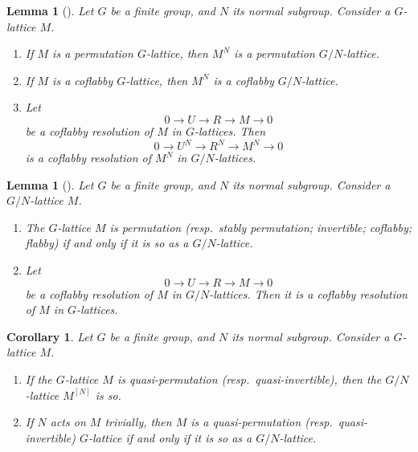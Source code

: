 \documentclass[12pt]{amsart}
\theoremstyle{plain}
\newtheorem{cor}[thm]{Corollary}
\newtheorem{lem}[thm]{Lemma}
\theoremstyle{definition}
\numberwithin{thm}{section}
\numberwithin{equation}{section}
\begin{document}
\begin{lem}[{\cite[p.~179, Lemme 2 (i), (ii), (iii)]{ColliotThelene1977}}]\label{lem:qtfx}
Let $G$ be a finite group, and $N$ its normal subgroup. Consider a $G$-lattice $M$. 
\begin{enumerate}
\item If $M$ is a permutation $G$-lattice, then $M^{N}$ is a permutation $G/N$-lattice. 
\item If $M$ is a coflabby $G$-lattice, then $M^{N}$ is a coflabby $G/N$-lattice. 
\item Let
\begin{equation*}
0\rightarrow U \rightarrow R \rightarrow M \rightarrow 0
\end{equation*}
be a coflabby resolution of $M$ in $G$-lattices. Then
\begin{equation*}
0\rightarrow U^{N} \rightarrow R^{N} \rightarrow M^{N} \rightarrow 0
\end{equation*}
is a coflabby resolution of $M^{N}$ in $G/N$-lattices. 
\end{enumerate}
\end{lem}

\begin{lem}[{\cite[p.~179, Lemme 2]{ColliotThelene1977}}]\label{lem:qtac}
Let $G$ be a finite group, and $N$ its normal subgroup. Consider a $G/N$-lattice $M$. 
\begin{enumerate}
\item The $G$-lattice $M$ is permutation (resp.~stably permutation; invertible; coflabby; flabby) if and only if it is so as a $G/N$-lattice. 
\item Let
\begin{equation*}
0\rightarrow U \rightarrow R \rightarrow M \rightarrow 0
\end{equation*}
be a coflabby resolution of $M$ in $G/N$-lattices. Then it is a coflabby resolution of $M$ in $G$-lattices. 
\end{enumerate}
\end{lem}

\begin{cor}\label{cor:qtac}
Let $G$ be a finite group, and $N$ its normal subgroup. Consider a $G$-lattice $M$. 
\begin{enumerate}
\item If the $G$-lattice $M$ is quasi-permutation (resp.~quasi-invertible), then the $G/N$-lattice $M^{[N]}$ is so. 
\item If $N$ acts on $M$ trivially, then $M$ is a quasi-permutation (resp.~quasi-invertible) $G$-lattice if and only if it is so as a $G/N$-lattice. 
\end{enumerate}
\end{cor}
\end{document}
